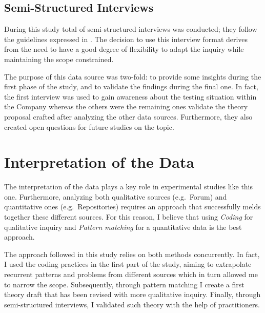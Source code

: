 
\subsection{Semi-Structured Interviews} \label{semi-structured_interviews}
During this study total of  semi-structured interviews was conducted; they follow the guidelines expressed in \cite{interview_guideline}. The decision to use this interview format derives from the need to have a good degree of flexibility to adapt the inquiry while maintaining the scope constrained.

The purpose of this data source was two-fold: to provide  some insights during the first phase of the study, and to validate the findings during the final one. In fact, the first interview was used to gain awareness about the testing situation within the Company whereas the others were the remaining ones validate the theory proposal crafted after analyzing the other data sources. Furthermore, they also created open questions for future studies on the topic.




%
%
%
%


%
%
%
%
\section{Interpretation of the Data} \label{data_interpretation}

The interpretation of the data plays a key role in experimental studies like this one. Furthermore, analyzing both qualitative sources (e.g.\ Forum) and quantitative ones (e.g.\ Repositories) requires an approach that successfully melds together these different sources. For this reason, I believe that using \textit{Coding} \cite{qualitative_inquiry} for qualitative inquiry and \textit{Pattern matching} \cite{case_study_guide} for a quantitative data is the best approach.

The approach followed in this study relies on both methods concurrently. In fact, I used the coding practices in the first part of the study, aiming to extrapolate recurrent patterns and problems from different sources which in turn allowed me to narrow the scope. Subsequently, through pattern matching I create a first theory draft that has been revised with more qualitative inquiry. Finally, through semi-structured interviews, I validated such theory with the help of practitioners.

